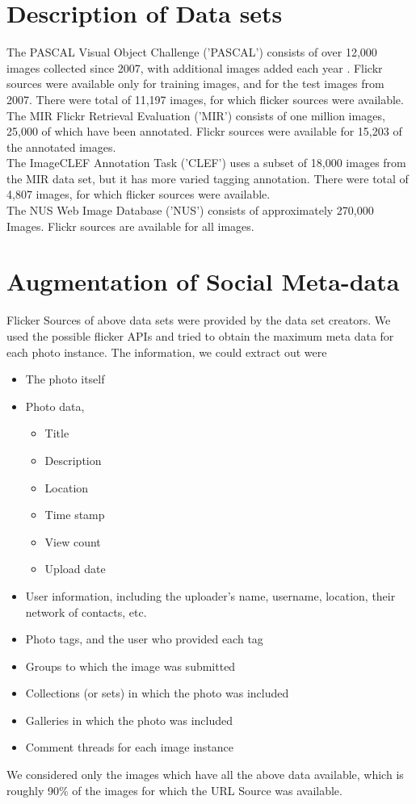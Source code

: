 \section{Description of Data sets}
The PASCAL Visual Object Challenge ('PASCAL') consists of over 12,000 images collected since 2007, with additional images added each year \cite{pascal}. Flickr sources were available only for training images, and for the test images from 2007. There were total of 11,197 images, for which flicker sources were available.\\
The MIR Flickr Retrieval Evaluation ('MIR') \cite{MIR} consists of one million images, 25,000 of which have been annotated. Flickr sources were available for 15,203 of the annotated images.\\
The ImageCLEF Annotation Task ('CLEF') \cite{CLEF} uses a subset of 18,000 images from the MIR data set, but it has more varied tagging annotation. There were total of 4,807 images, for which flicker sources were available. \\ 
The NUS Web Image Database ('NUS')  \cite{NUS} consists of approximately 270,000 Images. Flickr sources are available for all images.
\section{Augmentation of Social Meta-data}
Flicker Sources of above data sets were provided by the data set creators. We used the possible flicker APIs and tried to obtain the maximum meta data for each photo instance. The information, we could extract out were
\begin{itemize}
\item 	The photo itself
\item 	Photo data,
\begin{itemize}
\item Title
\item Description
\item Location
\item Time stamp
\item View count
\item Upload date
\end{itemize}
\item 	User information, including the uploader's name, username, location, their network of contacts, etc.
\item 	Photo tags, and the user who provided each tag
\item 	Groups to which the image was submitted 
\item 	Collections (or sets) in which the photo was included 
\item 	Galleries in which the photo was included 
\item 	 Comment threads for each image instance
\end{itemize}
We considered only the images which have all the above data available, which is roughly 90\% of the images for which the URL Source was available.
